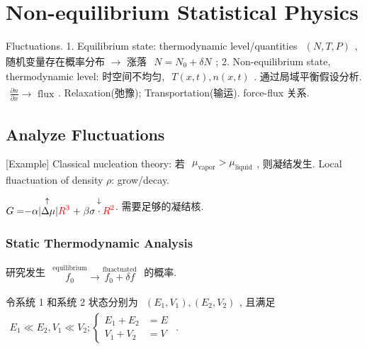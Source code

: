 \documentclass[../../main.tex]{subfiles}
\begin{document}
\section{Non-equilibrium Statistical Physics}
Fluctuations. 1. Equilibrium state: thermodynamic level/quantities $\begin{aligned}
    (N,T,P)
\end{aligned}$, 随机变量存在概率分布 $\rightarrow$ 涨落 $\begin{aligned}
    N = N_{0} + \delta N
\end{aligned}$; 2. Non-equilibrium state, thermodynamic level: 时空间不均匀, $\begin{aligned}
    T(x,t),n(x,t)
\end{aligned}$. 通过局域平衡假设分析. $\begin{aligned}
    \frac{\partial n}{\partial x}\rightarrow \text{ flux}
\end{aligned}$. Relaxation(弛豫); Transportation(输运). force-flux 关系. 

\subsection{Analyze Fluctuations}

[Example] Classical nucleation theory: 若 $\begin{aligned}
    \mu_{\text{vapor}} > \mu_{\text{liquid}}
\end{aligned}$, 则凝结发生. Local fluactuation of density $\rho$: grow/decay. 

$\begin{aligned}
    G = \stackrel{\uparrow}{-\alpha|\Delta \mu|{\color{red}{R^{3}}}} + \stackrel{\downarrow}{\beta\sigma\cdot {\color{red}{R^{2}}}}
\end{aligned}$. 需要足够{\color{red}{大}}的凝结核. 

\subsubsection{Static Thermodynamic Analysis}

研究发生 $\begin{aligned}
    \stackrel{\text{equilibrium}}{f_{0}}\rightarrow \stackrel{\text{fluactuated}}{f_{0} + \delta f}
\end{aligned}$ 的概率. 

令系统 1 和系统 2 状态分别为 $\begin{aligned}
    (E_{1},V_{1}), (E_{2},V_{2})
\end{aligned}$, 且满足 $\begin{aligned}
    E_{1}\ll E_{2}, V_{1}\ll V_{2}; \left\{\begin{aligned}
        E_{1} + E_{2} &= E\\
        V_{1} + V_{2} &= V
    \end{aligned}\right.
\end{aligned}$. 
\end{document}
